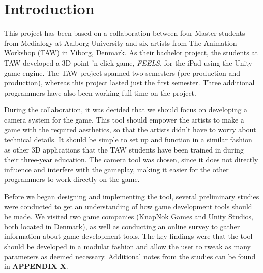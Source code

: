 \section{Introduction}


This project has been based on a collaboration between four Master students from Medialogy at Aalborg University and six artists from The Animation Workshop (TAW) in Viborg, Denmark. As their bachelor project, the students at TAW developed a 3D point 'n click game, \textit{FEELS}, for the iPad using the Unity game engine. The TAW project spanned two semesters (pre-production and production), whereas this project lasted just the first semester. Three additional programmers have also been working full-time on the project.

During the collaboration, it was decided that we should focus on developing a camera system for the game. This tool should empower the artists to make a game with the required aesthetics, so that the artists didn't have to worry about technical details. It should be simple to set up and function in a similar fashion as other 3D applications that the TAW students have been trained in during their three-year education. The camera tool was chosen, since it does not directly influence and interfere with the gameplay, making it easier for the other programmers to work directly on the game.

Before we began designing and implementing the tool, several preliminary studies were conducted to get an understanding of how game development tools should be made. We visited two game companies (KnapNok Games and Unity Studios, both located in Denmark), as well as conducting an online survey to gather information about game development tools. The key findings were that the tool should be developed in a modular fashion and allow the user to tweak as many parameters as deemed necessary. Additional notes from the studies can be found in \textbf{APPENDIX X}.
